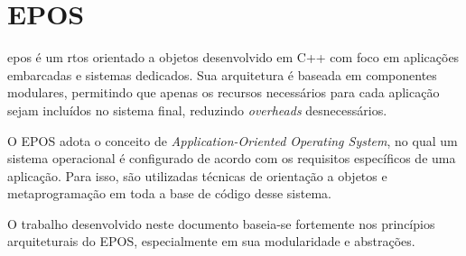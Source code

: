 \section{EPOS}

\gls{epos}  é um \gls{rtos} orientado a objetos desenvolvido em C++ com foco em aplicações embarcadas e sistemas dedicados.
Sua arquitetura é baseada em componentes modulares, permitindo que apenas os recursos necessários para cada aplicação sejam incluídos no sistema final,
reduzindo \textit{overheads} desnecessários.

O EPOS adota o conceito de \textit{Application-Oriented Operating System}, no qual um sistema operacional é configurado de acordo com os
requisitos específicos de uma aplicação. Para isso, são utilizadas técnicas de orientação a objetos e metaprogramação em toda a base de código desse sistema.

O trabalho desenvolvido neste documento baseia-se fortemente nos princípios arquiteturais do EPOS, especialmente em sua modularidade e abstrações.
